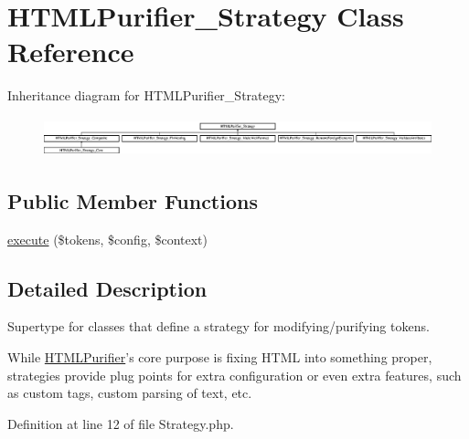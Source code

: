 \hypertarget{classHTMLPurifier__Strategy}{\section{H\+T\+M\+L\+Purifier\+\_\+\+Strategy Class Reference}
\label{classHTMLPurifier__Strategy}
}
Inheritance diagram for H\+T\+M\+L\+Purifier\+\_\+\+Strategy\+:\begin{figure}[H]
\begin{center}
\leavevmode
\includegraphics[height=1.135135cm]{classHTMLPurifier__Strategy}
\end{center}
\end{figure}
\subsection*{Public Member Functions}
\begin{DoxyCompactItemize}
\item 
\hyperlink{classHTMLPurifier__Strategy_ad41047139b0f7a417d4362ddf2b09bfb}{execute} (\$tokens, \$config, \$context)
\end{DoxyCompactItemize}


\subsection{Detailed Description}
Supertype for classes that define a strategy for modifying/purifying tokens.

While \hyperlink{classHTMLPurifier}{H\+T\+M\+L\+Purifier}'s core purpose is fixing H\+T\+M\+L into something proper, strategies provide plug points for extra configuration or even extra features, such as custom tags, custom parsing of text, etc. 

Definition at line 12 of file Strategy.\+php.



